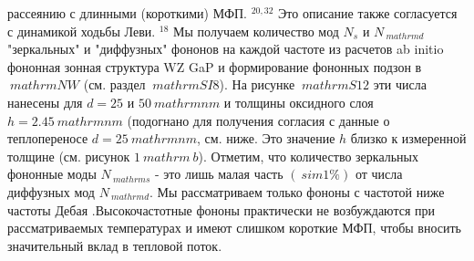 \documentclass[a4paper, 12pt]{article}%
\begin{document}
рассеянию с длинными (короткими) МФП. $ {} ^ {20,32} $ Это описание также согласуется с динамикой ходьбы Леви. $ {} ^ {18} $ Мы получаем количество мод $ N_ {s} $ и $ N _ {\ mathrm {d}} $ "зеркальных" и "диффузных" фононов на каждой частоте из расчетов ab initio фононная зонная структура WZ GaP и формирование фононных подзон в $ \ mathrm {NW} $ (см. раздел $ \ mathrm {SI} 8 $). На рисунке $ \ mathrm {S} 12 $ эти числа нанесены для $ d = 25 $ и $ 50 \ mathrm {nm} $ и толщины оксидного слоя $ h = 2.45 \ mathrm {nm} $ (подогнано для получения согласия с данные о теплопереносе $ d = 25 \ mathrm {nm} $, см. ниже. Это значение $ h $ близко к измеренной толщине (см. рисунок $ 1 \ mathrm {~ b} $). Отметим, что количество зеркальных фононные моды $ N _ {\ mathrm {s}} $ - это лишь малая часть $ (\ sim 1 \%) $ от числа диффузных мод $ N _ {\ mathrm {d}} $. Мы рассматриваем только фононы с частотой ниже частоты Дебая .Высокочастотные фононы практически не возбуждаются при рассматриваемых температурах и имеют слишком короткие МФП, чтобы вносить значительный вклад в тепловой поток.
\end{document}
